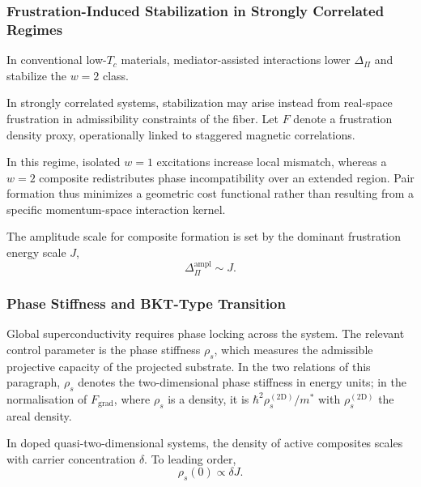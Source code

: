   \subsubsection*{Frustration-Induced Stabilization in Strongly Correlated Regimes}
    \label{subsubsec:frustration-stabilization}

    In conventional low-$T_c$ materials, mediator-assisted interactions lower
    $\Delta_{\Pi}$ and stabilize the $w=2$ class.

    In strongly correlated systems, stabilization may arise instead from
    real-space frustration in admissibility constraints of the fiber.
    Let $F$ denote a frustration density proxy, operationally linked to
    staggered magnetic correlations.

    In this regime, isolated $w=1$ excitations increase local mismatch,
    whereas a $w=2$ composite redistributes phase incompatibility
    over an extended region.
    Pair formation thus minimizes a geometric cost functional rather than
    resulting from a specific momentum-space interaction kernel.

    The amplitude scale for composite formation is set by the dominant
    frustration energy scale $J$,
    \begin{equation}
      \Delta_{\Pi}^{\text{ampl}} \sim J.
    \end{equation}

  \subsubsection*{Phase Stiffness and BKT-Type Transition}
    \label{subsubsec:phase-stiffness}

    Global superconductivity requires phase locking across the system.
    The relevant control parameter is the phase stiffness $\rho_s$,
    which measures the admissible projective capacity of the projected substrate.
    In the two relations of this paragraph, $\rho_s$ denotes the two-dimensional phase stiffness in energy
    units; in the normalisation of $F_{\text{grad}}$, where $\rho_s$ is a density, it is
    $\hbar^2\rho_s^{(2\mathrm{D})}/m^*$ with $\rho_s^{(2\mathrm{D})}$ the areal density.

    In doped quasi-two-dimensional systems, the density of active composites
    scales with carrier concentration $\delta$.
    To leading order,
    \begin{equation}
      \rho_s(0) \propto \delta J.
    \end{equation}

